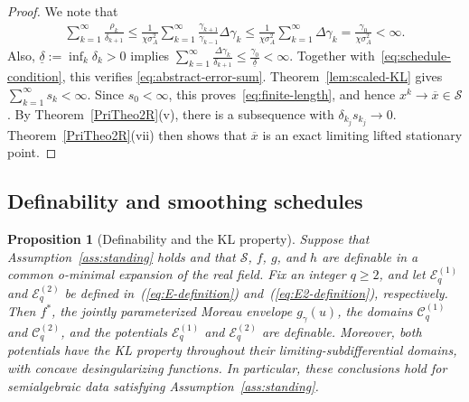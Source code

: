 \documentclass[9pt]{article}
\numberwithin{equation}{section}
\newtheorem{proposition}[theorem]{Proposition}
\theoremstyle{definition}
\theoremstyle{remark}
\newcommand{\Sset}{\mathcal S}
\newcommand{\Ecal}{\mathcal E}
\newcommand{\Ccal}{\mathcal C}
\begin{document}
\begin{proof}
We note that
\begin{eqnarray*}
\sum_{k=1}^{\infty}\frac{\rho_k}{\delta_{k+1}}\leq\frac1{\chi\sigma_A^2}
       \sum_{k=1}^{\infty}
       \frac{\gamma_{k+1}}{\gamma_{k-1}}\Delta\gamma_k\leq\frac1{\chi\sigma_A^2}
       \sum_{k=1}^{\infty}\Delta\gamma_k
 =\frac{\gamma_0}{\chi\sigma_A^2}<\infty.
\end{eqnarray*}
Also, $\underline\delta:=\inf_k\delta_k>0$ implies
$
 \sum_{k=1}^{\infty}\frac{\Delta\gamma_k}{\delta_{k+1}}
 \leq\frac{\gamma_0}{\underline\delta}<\infty.
$
Together with~\eqref{eq:schedule-condition}, this verifies
\eqref{eq:abstract-error-sum}.
Theorem~\ref{lem:scaled-KL} gives
$
 \sum_{k=1}^{\infty}s_k<\infty.
$
Since $s_0<\infty$, this proves~\eqref{eq:finite-length}, and hence
$x^k\to\overline x\in\Sset$.
By Theorem~\ref{PriTheo2R}(v), there is a subsequence with
$\delta_{k_j}s_{k_j}\to0$. Theorem~\ref{PriTheo2R}(vii) then shows
that $\overline x$ is an exact limiting lifted stationary point.
\end{proof}

\subsection{Definability and smoothing schedules}\label{sec:consequences}


\begin{proposition}[Definability and the KL property]
\label{prop:definable}
Suppose that Assumption~\ref{ass:standing} holds and that
$\Sset$, $f$, $g$, and $h$ are definable in a common o-minimal
expansion of the real field.
Fix an integer $q\geq2$, and let $\Ecal_q^{(1)}$ and
$\Ecal_q^{(2)}$ be
defined in~(\ref{eq:E-definition}) and~(\ref{eq:E2-definition}),
respectively. Then $f^*$, the jointly parameterized Moreau
envelope $g_{\gamma}(u)$, the domains $\Ccal_q^{(1)}$ and
$\Ccal_q^{(2)}$, and the potentials $\Ecal_q^{(1)}$ and
$\Ecal_q^{(2)}$ are definable. Moreover, both potentials
have the KL property throughout their limiting-subdifferential
domains, with concave desingularizing functions. In particular,
these conclusions hold for semialgebraic data satisfying
Assumption~\ref{ass:standing}.
\end{proposition}
\end{document}
